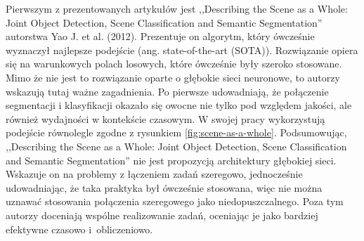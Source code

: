 \vspace{0.5cm}

Pierwszym z prezentowanych artykułów jest ,,Describing the Scene as a Whole: Joint Object Detection, Scene Classification and Semantic Segmentation'' autorstwa Yao J. et al. (2012)\cite{yao2012describing}. Prezentuje on algorytm, który ówcześnie wyznaczył najlepsze podejście (ang. state-of-the-art (SOTA)). Rozwiązanie opiera się na warunkowych polach losowych, które ówcześnie były szeroko stosowane. Mimo że nie jest to rozwiązanie oparte o głębokie sieci neuronowe, to autorzy wskazują tutaj ważne zagadnienia. Po pierwsze udowadniają, że połączenie segmentacji i klasyfikacji okazało się owocne nie tylko pod względem jakości, ale również wydajności w kontekście czasowym. W swojej pracy wykorzystują podejście równolegle zgodne z rysunkiem \ref{fig:scene-as-a-whole}. Podsumowując, ,,Describing the Scene as a Whole: Joint Object Detection, Scene Classification and Semantic Segmentation'' nie jest propozycją architektury głębokiej sieci. Wskazuje on na problemy z łączeniem zadań szeregowo, jednocześnie udowadniając, że taka praktyka był ówcześnie stosowana, więc nie można uznawać stosowania połączenia szeregowego jako niedopuszczalnego. Poza tym autorzy doceniają wspólne realizowanie zadań, oceniając je jako bardziej efektywne czasowo i~obliczeniowo.

